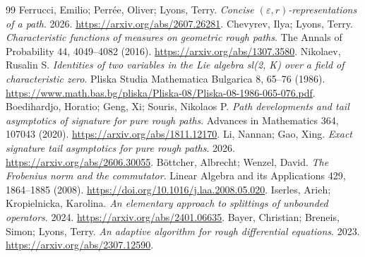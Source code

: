 \documentclass[11pt,a4paper]{article}
\begin{document}
\clearpage
\begin{thebibliography}{99}
Ferrucci, Emilio; Perr{\'e}e, Oliver; Lyons, Terry.
\emph{Concise $(\varepsilon, r)$-representations of a path}.
2026.
\url{https://arxiv.org/abs/2607.26281}.
Chevyrev, Ilya; Lyons, Terry.
\emph{Characteristic functions of measures on geometric rough paths}.
The Annals of Probability 44, 4049--4082 (2016).
\url{https://arxiv.org/abs/1307.3580}.
Nikolaev, Rusalin S.
\emph{Identities of two variables in the {L}ie algebra {sl}(2, {K}) over a field of characteristic zero}.
Pliska Studia Mathematica Bulgarica 8, 65--76 (1986).
\url{https://www.math.bas.bg/pliska/Pliska-08/Pliska-08-1986-065-076.pdf}.
Boedihardjo, Horatio; Geng, Xi; Souris, Nikolaos P.
\emph{Path developments and tail asymptotics of signature for pure rough paths}.
Advances in Mathematics 364, 107043 (2020).
\url{https://arxiv.org/abs/1811.12170}.
Li, Nannan; Gao, Xing.
\emph{Exact signature tail asymptotics for pure rough paths}.
2026.
\url{https://arxiv.org/abs/2606.30055}.
B{\"o}ttcher, Albrecht; Wenzel, David.
\emph{The Frobenius norm and the commutator}.
Linear Algebra and its Applications 429, 1864--1885 (2008).
\url{https://doi.org/10.1016/j.laa.2008.05.020}.
Iserles, Arieh; Kropielnicka, Karolina.
\emph{An elementary approach to splittings of unbounded operators}.
2024.
\url{https://arxiv.org/abs/2401.06635}.
Bayer, Christian; Breneis, Simon; Lyons, Terry.
\emph{An adaptive algorithm for rough differential equations}.
2023.
\url{https://arxiv.org/abs/2307.12590}.
\end{thebibliography}
\end{document}
